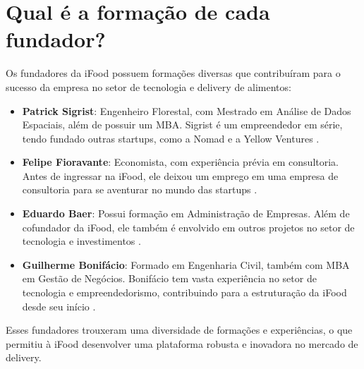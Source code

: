 \section{Qual é a formação de cada fundador?}

Os fundadores da iFood possuem formações diversas que contribuíram para o sucesso da empresa no setor de tecnologia e delivery de alimentos:

\begin{itemize}
    \item \textbf{Patrick Sigrist}: Engenheiro Florestal, com Mestrado em Análise de Dados Espaciais, além de possuir um MBA. Sigrist é um empreendedor em série, tendo fundado outras startups, como a Nomad e a Yellow Ventures \cite{sigrist2023}.
    
    \item \textbf{Felipe Fioravante}: Economista, com experiência prévia em consultoria. Antes de ingressar na iFood, ele deixou um emprego em uma empresa de consultoria para se aventurar no mundo das startups \cite{fioravante2023}.
    
    \item \textbf{Eduardo Baer}: Possui formação em Administração de Empresas. Além de cofundador da iFood, ele também é envolvido em outros projetos no setor de tecnologia e investimentos \cite{baer2023}.
    
    \item \textbf{Guilherme Bonifácio}: Formado em Engenharia Civil, também com MBA em Gestão de Negócios. Bonifácio tem vasta experiência no setor de tecnologia e empreendedorismo, contribuindo para a estruturação da iFood desde seu início \cite{bonifacio2023}.
\end{itemize}

Esses fundadores trouxeram uma diversidade de formações e experiências, o que permitiu à iFood desenvolver uma plataforma robusta e inovadora no mercado de delivery.

